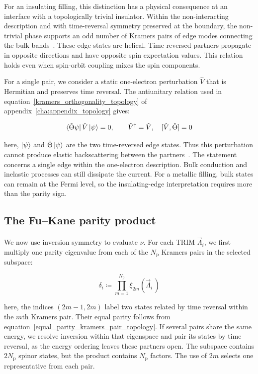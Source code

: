 For an insulating filling, this distinction has a physical consequence at an interface with a topologically trivial insulator.
Within the non-interacting description and with time-reversal symmetry preserved at the boundary,
the non-trivial phase supports an odd number of Kramers pairs of edge modes connecting the bulk bands~\cite{kane2005z2}.
These edge states are helical.
Time-reversed partners propagate in opposite directions and have opposite spin expectation values.
This relation holds even when spin-orbit coupling mixes the spin components.

For a single pair, we consider a static one-electron perturbation $\hat{V}$ that is Hermitian and preserves time reversal.
The antiunitary relation used in equation~\eqref{kramers_orthogonality_topology} of appendix~\ref{cha:appendix_topology} gives:

\begin{equation}
    \bra{\hat{\Theta}\psi}\hat{V}\ket{\psi}=0,
    \qquad
    \hat{V}^{\dagger}=\hat{V},\quad
    [\hat{V},\hat{\Theta}]=0
\label{helical_edge_backscattering_topology}
\end{equation}

here, $\ket{\psi}$ and $\hat{\Theta}\ket{\psi}$ are the two time-reversed edge states.
Thus this perturbation cannot produce elastic backscattering between the partners~\cite{kane2005z2}.
The statement concerns a single edge within the one-electron description.
Bulk conduction and inelastic processes can still dissipate the current.
For a metallic filling, bulk states can remain at the Fermi level,
so the insulating-edge interpretation requires more than the parity sign.

\subsection{The Fu--Kane parity product}

We now use inversion symmetry to evaluate $\nu$.
For each TRIM $\vec{\Lambda}_i$, we first multiply one parity eigenvalue from each of the $N_\mathrm{p}$ Kramers pairs in the selected subspace:

\begin{equation}
    \delta_i
    \coloneqq\prod_{m=1}^{N_\mathrm{p}}\xi_{2m}(\vec{\Lambda}_i\,)
\label{parity_product_at_trim_topology}
\end{equation}

here, the indices $(2m-1,2m)$ label two states related by time reversal within the $m$th Kramers pair.
Their equal parity follows from equation~\eqref{equal_parity_kramers_pair_topology}.
If several pairs share the same energy, we resolve inversion within that eigenspace and pair its states by time reversal,
as the energy ordering leaves these partners open.
The subspace contains $2N_\mathrm{p}$ spinor states, but the product contains $N_\mathrm{p}$ factors.
The use of $2m$ selects one representative from each pair.


